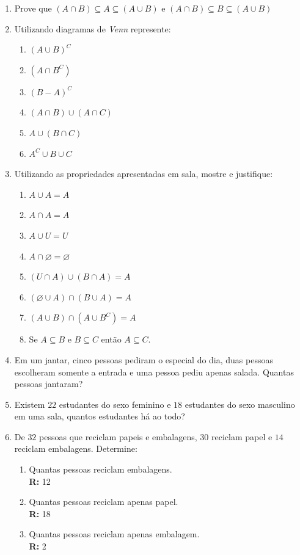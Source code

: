 \documentclass[oneside,a4paper,12pt]{article}
\begin{document}
\begin{enumerate}
	\item Prove que $(A \cap B) \subseteq A \subseteq (A \cup B)$ e $(A \cap B) \subseteq B \subseteq (A \cup B)$

	\item Utilizando diagramas de {\it Venn} represente:
	\begin{enumerate}
		\item $(A\cup B)^{C}$
		\item $(A \cap B^{C})$
		\item $(B-A)^{C}$
		\item $(A \cap B) \cup (A \cap C)$
		\item $A \cup (B \cap C)$
		\item $A^{C} \cup B \cup C$
	\end{enumerate}
	
	\item Utilizando as propriedades apresentadas em sala, mostre e justifique:
	\begin{enumerate}
		\item $A \cup A = A$
		\item $A \cap A = A$
		\item $A \cup U = U$
		\item $A \cap \varnothing = \varnothing$
		\item $(U \cap A) \cup (B \cap A) = A$
		\item $(\varnothing \cup A)\cap(B \cup A) = A$
		\item $(A \cup B) \cap (A \cup B^{C}) = A$
		\item Se $A \subseteq B$ e $B \subseteq C$ então $A \subseteq C$.
	\end{enumerate}

	\item Em um jantar, cinco pessoas pediram o especial do dia, duas pessoas escolheram somente a entrada e uma pessoa pediu apenas salada. Quantas pessoas jantaram?

	\item Existem $22$ estudantes do sexo feminino e $18$ estudantes do sexo masculino em uma sala, quantos estudantes há ao todo?

	\item De $32$ pessoas que reciclam papeis e embalagens, $30$ reciclam papel e $14$ reciclam embalagens. Determine:
	\begin{enumerate}
		\item Quantas pessoas reciclam embalagens. \\ {\bf R:} 12
		\item Quantas pessoas reciclam apenas papel. \\ {\bf R:} 18
		\item Quantas pessoas reciclam apenas embalagem. \\ {\bf R:} 2
	\end{enumerate}


\end{enumerate}
\end{document}
